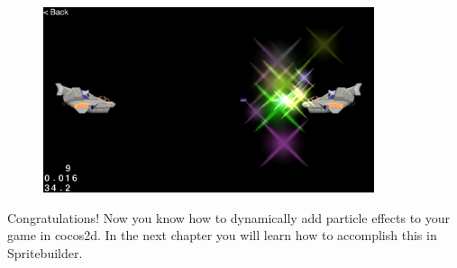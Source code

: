 \documentclass{scrreprt}
\newcommand{\cocos}{cocos2d}
\begin{document}
\begin{figure}[H]
		\centering
		\includegraphics[width=275pt]{images/particles/particle_explosion.png}   
\end{figure}

Congratulations! Now you know how to dynamically add particle effects to your
game in \cocos{}. In the next chapter you will learn how to accomplish this in
Spritebuilder.
\end{document}
